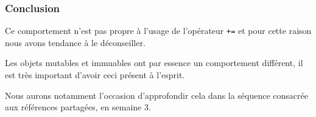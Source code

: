     \hypertarget{conclusion}{%
\subsubsection{Conclusion}\label{conclusion}}

    Ce comportement n'est pas propre à l'usage de l'opérateur \texttt{+=} et
pour cette raison nous avons tendance à le déconseiller.

Les objets mutables et immuables ont par essence un comportement
différent, il est très important d'avoir ceci présent à l'esprit.

Nous aurons notamment l'occasion d'approfondir cela dans la séquence
consacrée aux références partagées, en semaine 3.


    
    
    
